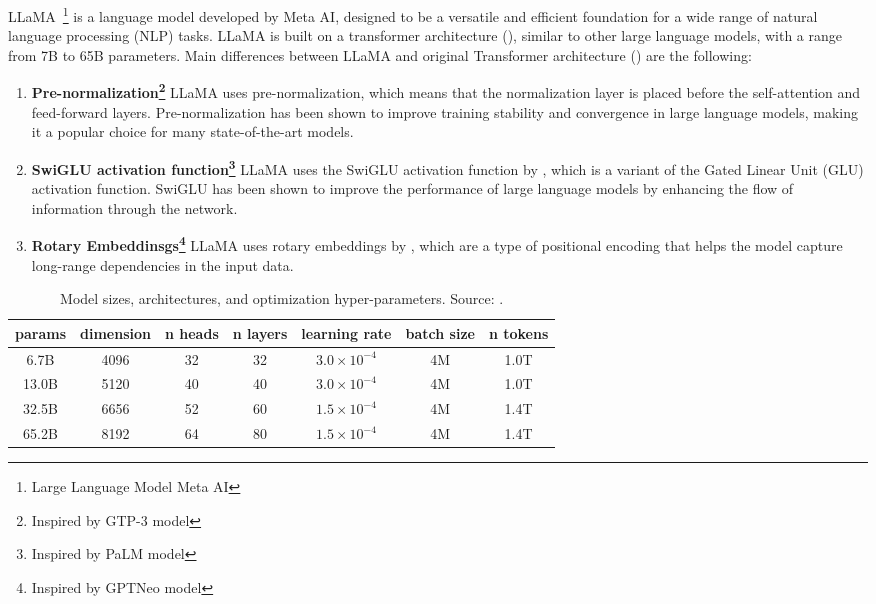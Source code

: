 LLaMA~\footnote{Large Language Model Meta AI} is a language model developed by Meta AI, designed to be a versatile and efficient foundation for a wide range of natural language processing (NLP) tasks.
LLaMA is built on a transformer architecture (\textcite{vaswani2023attention}), similar to other large language models, with a range from 7B to 65B parameters.
Main differences between LLaMA and original Transformer architecture (\textcite{vaswani2023attention}) are the following:
\begin{enumerate}
	\item \textbf{Pre-normalization\footnote{Inspired by GTP-3 model}} {LLaMA uses pre-normalization, which means that the normalization layer is placed before the self-attention and feed-forward layers.
		      Pre-normalization has been shown to improve training stability and convergence in large language models, making it a popular choice for many state-of-the-art models.
	      }
	\item \textbf{SwiGLU activation function\footnote{Inspired by PaLM model}} {LLaMA uses the SwiGLU activation function by \textcite{shazeer2020glu}, which is a variant of the Gated Linear Unit (GLU) activation function.
		      SwiGLU has been shown to improve the performance of large language models by enhancing the flow of information through the network.
	      }
	\item \textbf{Rotary Embeddinsgs\footnote{Inspired by GPTNeo model}} {LLaMA uses rotary embeddings by \textcite{su2021roformer}, which are a type of positional encoding that helps the model capture long-range dependencies in the input data.
	      }
\end{enumerate}

\begin{table}[ht]
	\centering
	\begin{tabular}{@{}ccccccc@{}}
		\toprule
		params & dimension & n heads & n layers & learning rate          & batch size & n tokens \\
		\midrule
		6.7B   & 4096      & 32      & 32       & \(3.0 \times 10^{-4}\) & 4M         & 1.0T     \\
		13.0B  & 5120      & 40      & 40       & \(3.0 \times 10^{-4}\) & 4M         & 1.0T     \\
		32.5B  & 6656      & 52      & 60       & \(1.5 \times 10^{-4}\) & 4M         & 1.4T     \\
		65.2B  & 8192      & 64      & 80       & \(1.5 \times 10^{-4}\) & 4M         & 1.4T     \\
		\bottomrule
	\end{tabular}
	\caption{Model sizes, architectures, and optimization hyper-parameters. Source: \protect\textcite{touvron2023llama}.}
	\label{tab:llama-model-params}
\end{table}

